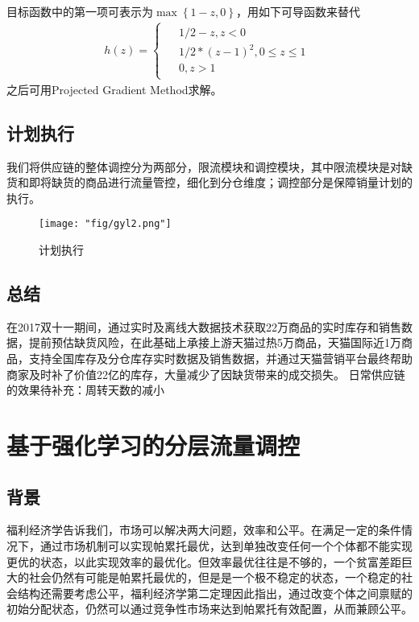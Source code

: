 目标函数中的第一项可表示为$\max \left \{1-z,0  \right \} $，用如下可导函数来替代
\begin{align}
h\left ( z \right )=\left \{ 
\begin{matrix} 
\begin{split}
&1/2-z, z < 0\\
&1/2*\left ( z-1 \right )^{2},0 \leq z\leq 1\\
&0, z > 1
  \end{split}
\end{matrix}
\right.
\end{align}
之后可用Projected Gradient Method求解。

\subsection{计划执行}
我们将供应链的整体调控分为两部分，限流模块和调控模块，其中限流模块是对缺货和即将缺货的商品进行流量管控，细化到分仓维度；调控部分是保障销量计划的执行。

\begin{figure}[!h]
	\centering
	\texttt{[image: "fig/gyl2.png"]}
	\caption{计划执行}
	\label{fig:gyl2}
\end{figure}

\subsection{总结}
在2017双十一期间，通过实时及离线大数据技术获取22万商品的实时库存和销售数据，提前预估缺货风险，在此基础上承接上游天猫过热5万商品，天猫国际近1万商品，支持全国库存及分仓库存实时数据及销售数据，并通过天猫营销平台最终帮助商家及时补了价值22亿的库存，大量减少了因缺货带来的成交损失。
日常供应链的效果待补充：周转天数的减小

\section{基于强化学习的分层流量调控}
\subsection{背景}
福利经济学告诉我们，市场可以解决两大问题，效率和公平。在满足一定的条件情况下，通过市场机制可以实现帕累托最优，达到单独改变任何一个个体都不能实现更优的状态，以此实现效率的最优化。但效率最优往往是不够的，一个贫富差距巨大的社会仍然有可能是帕累托最优的，但是是一个极不稳定的状态，一个稳定的社会结构还需要考虑公平，福利经济学第二定理因此指出，通过改变个体之间禀赋的初始分配状态，仍然可以通过竞争性市场来达到帕累托有效配置，从而兼顾公平。

